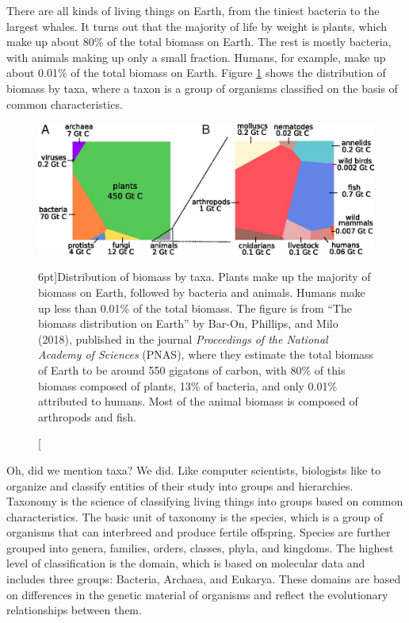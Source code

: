 There are all kinds of living things on Earth, from the tiniest bacteria to the largest whales. It turns out that the majority of life by weight is plants, which make up about 80\% of the total biomass on Earth. The rest is mostly bacteria, with animals making up only a small fraction. Humans, for example, make up about 0.01\% of the total biomass on Earth. Figure \ref{fig:biomass} shows the distribution of biomass by taxa, where a taxon is a group of organisms classified on the basis of common characteristics.

\begin{figure}
  \includegraphics{figs/molbiol/biomass.jpeg}
  \caption[][6pt]{Distribution of biomass by taxa. Plants make up the majority of biomass on Earth, followed by bacteria and animals. Humans make up less than 0.01\% of the total biomass. The figure is from ``The biomass distribution on Earth'' by Bar-On, Phillips, and Milo (2018), published in the journal {\em Proceedings of the National Academy of Sciences} (PNAS), where they estimate the total biomass of Earth to be around 550 gigatons of carbon, with 80\% of this biomass composed of plants, 13\% of bacteria, and only 0.01\% attributed to humans. Most of the animal biomass is composed of arthropods and fish.}
  \label{fig:biomass}
\end{figure}

Oh, did we mention taxa? We did. Like computer scientists, biologists like to organize and classify entities of their study into groups and hierarchies. Taxonomy is the science of classifying living things into groups based on common characteristics. The basic unit of taxonomy is the species, which is a group of organisms that can interbreed and produce fertile offspring. Species are further grouped into genera, families, orders, classes, phyla, and kingdoms. The highest level of classification is the domain, which is based on molecular data and includes three groups: Bacteria, Archaea, and Eukarya. These domains are based on differences in the genetic material of organisms and reflect the evolutionary relationships between them.

